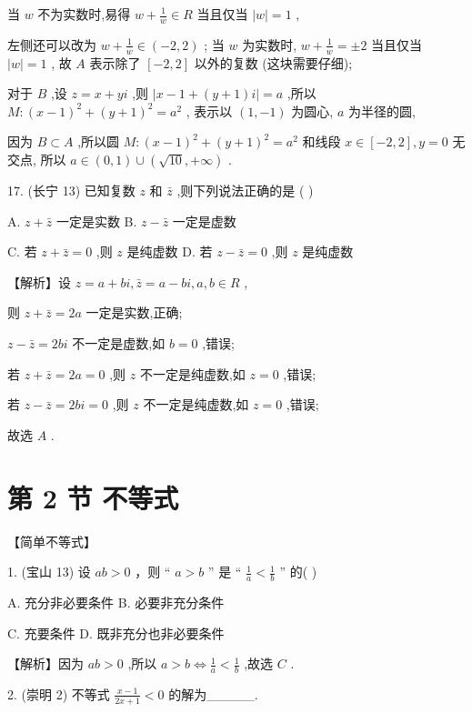 \documentclass[10pt]{article}
\begin{document}
当 \(w\) 不为实数时,易得 \(w + \frac{1}{w} \in  R\) 当且仅当 \(\left| w\right|  = 1\) ,

左侧还可以改为 \(w + \frac{1}{w} \in  \left( {-2,2}\right)\) ; 当 \(w\) 为实数时, \(w + \frac{1}{w} =  \pm  2\) 当且仅当 \(\left| w\right|  = 1\) , 故 \(A\) 表示除了 \(\left\lbrack  {-2,2}\right\rbrack\) 以外的复数 (这块需要仔细);

对于 \(B\) ,设 \(z = x + {yi}\) ,则 \(\left| {x - 1 + \left( {y + 1}\right) i}\right|  = a\) ,所以 \(M : {\left( x - 1\right) }^{2} + {\left( y + 1\right) }^{2} = {a}^{2}\) , 表示以 \(\left( {1, - 1}\right)\) 为圆心, \(a\) 为半径的圆,

因为 \(B \subset  A\) ,所以圆 \(M : {\left( x - 1\right) }^{2} + {\left( y + 1\right) }^{2} = {a}^{2}\) 和线段 \(x \in  \left\lbrack  {-2,2}\right\rbrack  ,y = 0\) 无交点, 所以 \(a \in  \left( {0,1}\right)  \cup  \left( {\sqrt{10}, + \infty }\right)\) .

17. (长宁 13) 已知复数 \(z\) 和 \(\bar{z}\) ,则下列说法正确的是 ( )

A. \(z + \bar{z}\) 一定是实数 B. \(z - \bar{z}\) 一定是虚数

C. 若 \(z + \bar{z} = 0\) ,则 \(z\) 是纯虚数 D. 若 \(z - \bar{z} = 0\) ,则 \(z\) 是纯虚数

【解析】设 \(z = a + {bi},\bar{z} = a - {bi},a,b \in  R\) ,

则 \(z + \bar{z} = {2a}\) 一定是实数,正确;

\(z - \bar{z} = {2bi}\) 不一定是虚数,如 \(b = 0\) ,错误;

若 \(z + \bar{z} = {2a} = 0\) ,则 \(z\) 不一定是纯虚数,如 \(z = 0\) ,错误;

若 \(z - \bar{z} = {2bi} = 0\) ,则 \(z\) 不一定是纯虚数,如 \(z = 0\) ,错误;

故选 \(A\) .

\section*{第 2 节 不等式}

【简单不等式】

1. (宝山 13) 设 \({ab} > 0\) ，则 “ \(a > b\) ” 是 “ \(\frac{1}{a} < \frac{1}{b}\) ” 的( )

A. 充分非必要条件 B. 必要非充分条件

C. 充要条件 D. 既非充分也非必要条件

【解析】因为 \({ab} > 0\) ,所以 \(a > b \Leftrightarrow  \frac{1}{a} < \frac{1}{b}\) ,故选 \(C\) .

2. (崇明 2) 不等式 \(\frac{x - 1}{{2x} + 1} < 0\) 的解为\_\_\_\_\_.
\end{document}
